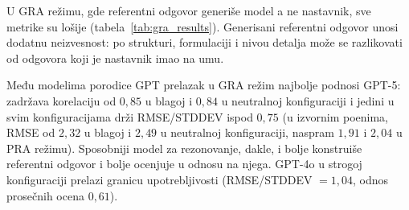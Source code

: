 \begin{table}[ht]
\centering
\caption{Metrike performansi za GRA režim.
Najbolji rezultati za svaku metriku i konfiguraciju strogosti označeni su podebljano.
Za modele DeepSeek-Chat i DeepSeek-Reasoner generisanje referentnog odgovora nije uspelo na kursu Programiranje 2 (477 od 583 odgovora),
pa njihove vrednosti pretežno odražavaju ocenjivanje bez referentnog odgovora (odeljak~\ref{sec:gra-greska}).}
\label{tab:gra_results}
\end{table}

U GRA režimu, gde referentni odgovor generiše model a ne nastavnik, sve metrike su lošije (tabela~\ref{tab:gra_results}).
Generisani referentni odgovor unosi dodatnu neizvesnost: po strukturi,
formulaciji i nivou detalja može se razlikovati od odgovora koji je nastavnik imao na umu.

Među modelima porodice GPT prelazak u GRA režim najbolje podnosi GPT-5:
zadržava korelaciju od $0{,}85$ u blagoj i $0{,}84$ u neutralnoj konfiguraciji i jedini u svim konfiguracijama drži RMSE/STDDEV ispod $0{,}75$
(u izvornim poenima, RMSE od $2{,}32$ u blagoj i $2{,}49$ u neutralnoj konfiguraciji, naspram $1{,}91$ i $2{,}04$ u PRA režimu).
Sposobniji model za rezonovanje, dakle, i bolje konstruiše referentni odgovor i bolje ocenjuje u odnosu na njega.
GPT-4o u strogoj konfiguraciji prelazi granicu upotrebljivosti (RMSE/STDDEV $=1{,}04$, odnos prosečnih ocena $0{,}61$).

